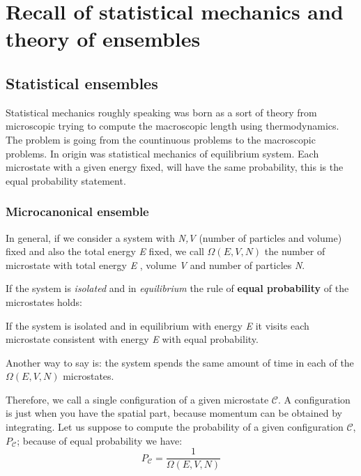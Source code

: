 \documentclass[../main/main.tex]{subfiles}
\begin{document}
\chapter{Recall of statistical mechanics and theory of ensembles}

\section{Statistical ensembles}
Statistical mechanics roughly speaking was born as a sort of theory from microscopic trying to compute the macroscopic length using thermodynamics. The problem is going from the countinuous problems to the macroscopic problems. In origin was statistical mechanics of equilibrium system. Each microstate with a given energy fixed, will have the same probability, this is the equal probability statement.

\subsection{Microcanonical ensemble}
In general, if we consider a system with \emph{N,V} (number of particles and volume) fixed and also the total energy \emph{E} fixed, we call \( \Omega (E,V,N) \)  the number of microstate with total energy \emph{E} , volume \emph{V} and number of particles \emph{N}.

If the system is \emph{isolated} and in \emph{equilibrium} the rule of \textbf{equal probability} of the microstates holds:
\begin{orangebox}
If the system is isolated and in equilibrium with energy \emph{E} it visits each microstate consistent with energy \emph{E} with equal probability.
\end{orangebox}
Another way to say is: the system spends the same amount of time in each of the \( \Omega (E,V,N) \) microstates.

Therefore, we call  a single configuration of a given microstate \( \mathcal{C}  \). A configuration is just when you have the spatial part, because momentum can be obtained by integrating.
Let us suppose to compute the probability of a given configuration \( \mathcal{C}  \), \( P_{\mathcal{C}} \); because of equal probability we have:
\begin{equation}
  P_{\mathcal{C}} = \frac{1}{\Omega (E,V,N)}
  \label{eq:}
\end{equation}
\end{document}
